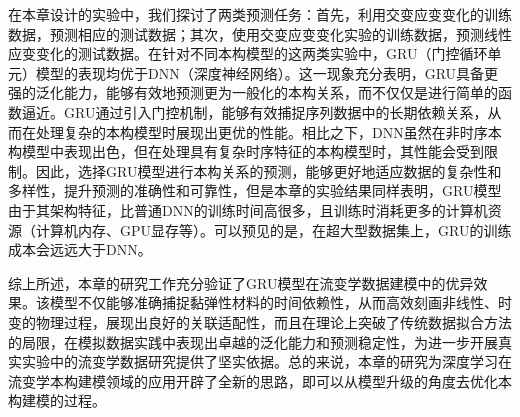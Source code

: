 在本章设计的实验中，我们探讨了两类预测任务：首先，利用交变应变变化的训练数据，预测相应的测试数据；其次，使用交变应变变化实验的训练数据，预测线性应变变化的测试数据。在针对不同本构模型的这两类实验中，GRU（门控循环单元）模型的表现均优于DNN（深度神经网络）。这一现象充分表明，GRU具备更强的泛化能力，能够有效地预测更为一般化的本构关系，而不仅仅是进行简单的函数逼近。GRU通过引入门控机制，能够有效捕捉序列数据中的长期依赖关系，从而在处理复杂的本构模型时展现出更优的性能。相比之下，DNN虽然在非时序本构模型中表现出色，但在处理具有复杂时序特征的本构模型时，其性能会受到限制。因此，选择GRU模型进行本构关系的预测，能够更好地适应数据的复杂性和多样性，提升预测的准确性和可靠性，但是本章的实验结果同样表明，GRU模型由于其架构特征，比普通DNN的训练时间高很多，且训练时消耗更多的计算机资源（计算机内存、GPU显存等）。可以预见的是，在超大型数据集上，GRU的训练成本会远远大于DNN。

综上所述，本章的研究工作充分验证了GRU模型在流变学数据建模中的优异效果。该模型不仅能够准确捕捉黏弹性材料的时间依赖性，从而高效刻画非线性、时变的物理过程，展现出良好的关联适配性，而且在理论上突破了传统数据拟合方法的局限，在模拟数据实践中表现出卓越的泛化能力和预测稳定性，为进一步开展真实实验中的流变学数据研究提供了坚实依据。总的来说，本章的研究为深度学习在流变学本构建模领域的应用开辟了全新的思路，即可以从模型升级的角度去优化本构建模的过程。











